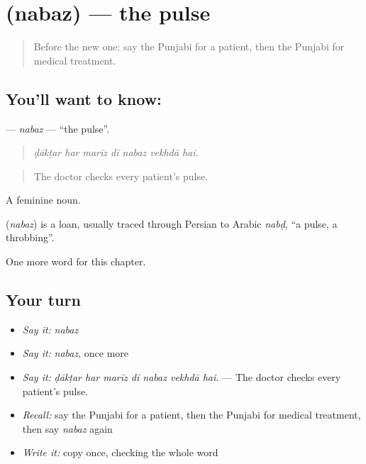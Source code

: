 \section[\texorpdfstring{\pa{ਨਬਜ਼} (nabaz)}{ਨਬਜ਼ (nabaz)}]{ (nabaz) — the pulse}

\label{lesson:PA-C320-nabaz}



\begin{quote}
Before the new one: say the Punjabi for a patient, then the Punjabi for medical treatment.
\end{quote}

\subsection*{You'll want to know: }
\textbf{} — \emph{nabaz} — \textquotedblleft{}the pulse\textquotedblright{}.

\begin{quote}
      
\end{quote}

\begin{quote}
\emph{ḍākṭar har marīz dī nabaz vekhdā hai.}
\end{quote}

\begin{quote}
The doctor checks every patient's pulse.
\end{quote}

A feminine noun.

\begin{cousinweb}
\textbf{} (\emph{nabaz}) is a loan, usually traced through Persian to Arabic \emph{nabḍ}, \textquotedblleft{}a pulse, a throbbing\textquotedblright{}.
\end{cousinweb}

\begin{grammarlens}[title={What you've built}]
One more word for this chapter.
\end{grammarlens}

\subsection*{Your turn}
\begin{itemize}
\raggedright
  \item \emph{Say it:} \emph{nabaz}
  \item \emph{Say it:} \emph{nabaz}, once more
  \item \emph{Say it:} \emph{ḍākṭar har marīz dī nabaz vekhdā hai.} — The doctor checks every patient's pulse.
  \item \emph{Recall:} say the Punjabi for a patient, then the Punjabi for medical treatment, then say \emph{nabaz} again
  \item \emph{Write it:} copy \textbf{} once, checking the whole word
\end{itemize}

